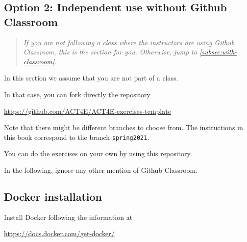 \subsection{Option 2: Independent use without Github Classroom}
\label{sub:without-classroom}

\begin{quote}
  \emph{
    If you are \emph{not} following a class where the instructors are using Github Classroom,
    this is the section for you. Otherwise, jump to \cref{subsec:with-classroom}.
  }
\end{quote}

In this section we assume that you are not part of a class.

In that case, you can fork directly the repository

\url{https://github.com/ACT4E/ACT4E-exercises-template}

Note that there might be different branches to choose from. The instructions in this book correspond to
the branch \texttt{spring2021}.

You can do the exercises on your own by using this repository.

In the following, ignore any other mention of Github Classroom.

\subsection{Docker installation}

Install Docker following the information at

\url{https://docs.docker.com/get-docker/}

